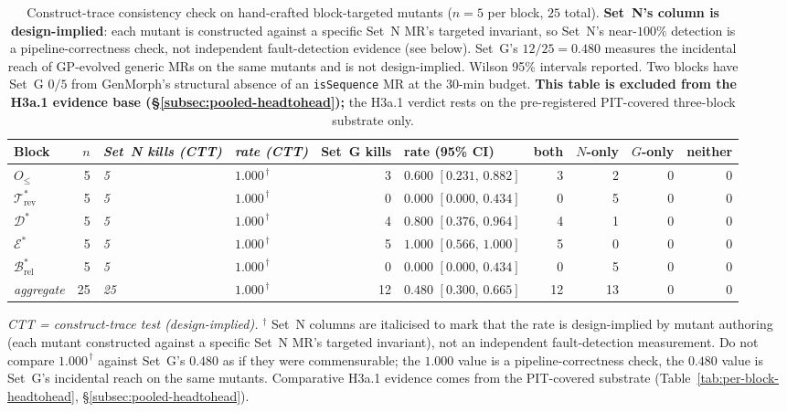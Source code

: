 \begin{table}[h]
\centering
\caption{Construct-trace consistency check on hand-crafted block-targeted
mutants ($n = 5$ per block, $25$ total). \textbf{Set~N's column is
design-implied}: each mutant is constructed against a specific Set~N
MR's targeted invariant, so Set~N's near-$100\%$ detection is a
pipeline-correctness check, not independent fault-detection evidence
(see  below).
Set~G's $12/25 = 0.480$ measures the incidental reach of GP-evolved
generic MRs on the same mutants and is not design-implied.
Wilson 95\% intervals reported. Two blocks have Set~G $0/5$ from
GenMorph's structural absence of an \texttt{isSequence} MR at the
$30$-min budget. \textbf{This table is excluded from the H3a.1
evidence base (\S\ref{subsec:pooled-headtohead});} the H3a.1 verdict
rests on the pre-registered PIT-covered three-block substrate only.}
\label{tab:augmented-stratum}
\small
\begin{tabular}{lr l l r l r r r r}
\toprule
Block & $n$ & \emph{Set~N kills (CTT)} & \emph{rate (CTT)} & Set~G kills & rate (95\% CI) & both & $N$-only & $G$-only & neither \\
\midrule
$O_{\le}$                                  & 5 & \emph{5} & \emph{$1.000^{\,\dagger}$} & 3 & $0.600$ $[0.231,\,0.882]$ & 3 & 2 & 0 & 0 \\
$\mathcal{T}^{*}_{\mathrm{rev}}$           & 5 & \emph{5} & \emph{$1.000^{\,\dagger}$} & 0 & $0.000$ $[0.000,\,0.434]$ & 0 & 5 & 0 & 0 \\
$\mathcal{D}^{*}$                          & 5 & \emph{5} & \emph{$1.000^{\,\dagger}$} & 4 & $0.800$ $[0.376,\,0.964]$ & 4 & 1 & 0 & 0 \\
$\mathcal{E}^{*}$                          & 5 & \emph{5} & \emph{$1.000^{\,\dagger}$} & 5 & $1.000$ $[0.566,\,1.000]$ & 5 & 0 & 0 & 0 \\
$\mathcal{B}^{*}_{\mathrm{rel}}$           & 5 & \emph{5} & \emph{$1.000^{\,\dagger}$} & 0 & $0.000$ $[0.000,\,0.434]$ & 0 & 5 & 0 & 0 \\
\midrule
\textit{aggregate} & 25 & \emph{25} & \emph{$1.000^{\,\dagger}$} & 12 & $0.480$ $[0.300,\,0.665]$ & 12 & 13 & 0 & 0 \\
\bottomrule
\end{tabular}

\smallskip
\footnotesize
\textit{CTT = construct-trace test (design-implied).}
$^\dagger$ Set~N columns are italicised to mark that the rate is design-implied by mutant authoring (each mutant constructed against a specific Set~N MR's targeted invariant), not an independent fault-detection measurement. Do not compare $1.000^{\,\dagger}$ against Set~G's $0.480$ as if they were commensurable; the $1.000$ value is a pipeline-correctness check, the $0.480$ value is Set~G's incidental reach on the same mutants. Comparative H3a.1 evidence comes from the PIT-covered substrate (Table~\ref{tab:per-block-headtohead}, \S\ref{subsec:pooled-headtohead}).
\end{table}

